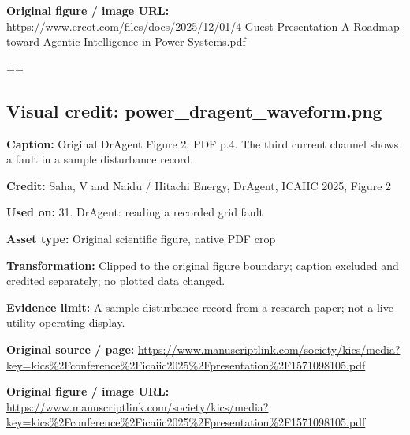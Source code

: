 \documentclass[10pt,letterpaper]{article}
\begin{document}
\textbf{Original figure / image URL:} \href{https://www.ercot.com/files/docs/2025/12/01/4-Guest-Presentation-A-Roadmap-toward-Agentic-Intelligence-in-Power-Systems.pdf}{\small\ttfamily https:/\allowbreak{}/\allowbreak{}www.\allowbreak{}ercot.\allowbreak{}com/\allowbreak{}files/\allowbreak{}docs/\allowbreak{}2025/\allowbreak{}12/\allowbreak{}01/\allowbreak{}4-\allowbreak{}Guest-\allowbreak{}Presentation-\allowbreak{}A-\allowbreak{}Roadmap-\allowbreak{}toward-\allowbreak{}Agentic-\allowbreak{}Intelligence-\allowbreak{}in-\allowbreak{}Power-\allowbreak{}Systems.\allowbreak{}pdf}\par
\egroup\par\noindent\box\readingEntry\par\medskip
\setbox\readingEntry=\vbox\bgroup\hsize=\linewidth\subsection*{Visual credit: power\_dragent\_waveform.png}
\textbf{Caption:} Original DrAgent Figure 2, PDF p.4. The third current channel shows a fault in a sample disturbance record.\par
\textbf{Credit:} Saha, V and Naidu / Hitachi Energy, DrAgent, ICAIIC 2025, Figure 2\par
\textbf{Used on:} 31. DrAgent: reading a recorded grid fault\par
\textbf{Asset type:} Original scientific figure, native PDF crop\par
\textbf{Transformation:} Clipped to the original figure boundary; caption excluded and credited separately; no plotted data changed.\par
\textbf{Evidence limit:} A sample disturbance record from a research paper; not a live utility operating display.\par
\textbf{Original source / page:} \href{https://www.manuscriptlink.com/society/kics/media?key=kics\%2Fconference\%2Ficaiic2025\%2Fpresentation\%2F1571098105.pdf}{\small\ttfamily https:/\allowbreak{}/\allowbreak{}www.\allowbreak{}manuscriptlink.\allowbreak{}com/\allowbreak{}society/\allowbreak{}kics/\allowbreak{}media?\allowbreak{}key=\allowbreak{}kics\%\allowbreak{}2Fconference\%\allowbreak{}2Ficaiic2025\%\allowbreak{}2Fpresentation\%\allowbreak{}2F1571098105.\allowbreak{}pdf}\par
\textbf{Original figure / image URL:} \href{https://www.manuscriptlink.com/society/kics/media?key=kics\%2Fconference\%2Ficaiic2025\%2Fpresentation\%2F1571098105.pdf}{\small\ttfamily https:/\allowbreak{}/\allowbreak{}www.\allowbreak{}manuscriptlink.\allowbreak{}com/\allowbreak{}society/\allowbreak{}kics/\allowbreak{}media?\allowbreak{}key=\allowbreak{}kics\%\allowbreak{}2Fconference\%\allowbreak{}2Ficaiic2025\%\allowbreak{}2Fpresentation\%\allowbreak{}2F1571098105.\allowbreak{}pdf}\par
\end{document}
